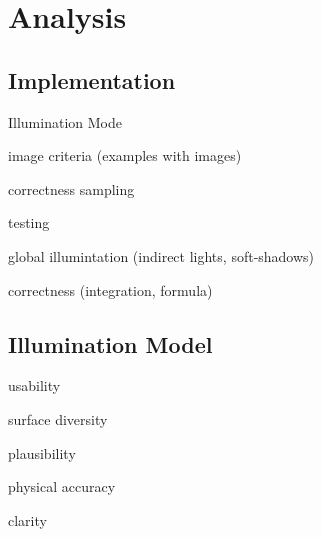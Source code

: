 \chapter{Analysis}

\section{Implementation}

\begin{list}{}{}
    \item Illumination Mode
    \begin{list}{}{}
        \item image criteria (examples with images)
        \item correctness sampling
    \end{list}
    \item testing
    \begin{list}{}{}
        \item global illumintation (indirect lights, soft-shadows)
        \item correctness (integration, formula)
    \end{list}
\end{list}

\section{Illumination Model}

\begin{list}{}{}
    \item usability
    \item surface diversity
    \item plausibility
    \item physical accuracy
    \item clarity
\end{list}


